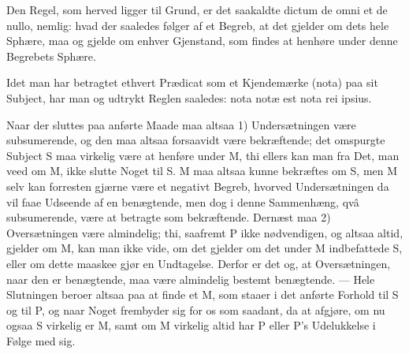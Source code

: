 \documentclass[12pt]{book}
\def\textit#1{#1}%
\newcommand{\opage}[1]{\marginnote{\footnotesize\textit{[#1]}}}
\begin{document}
Den Regel, som herved ligger til Grund, er det saakaldte \textit{dictum de omni
et de nullo}, nemlig: hvad der saaledes følger af et Begreb, at det gjelder om
dets hele Sphære, maa og gjelde om enhver Gjenstand, som findes at henhøre
under denne Begrebets Sphære.

Idet man har betragtet ethvert Prædicat som et Kjendemærke (\textit{nota}) paa
sit Subject, har
\opage{338} man og udtrykt Reglen saaledes: \textit{nota notæ est nota rei ipsius}.

Naar der sluttes paa anførte Maade maa altsaa 1) Undersætningen være
subsumerende, og den maa altsaa forsaavidt være bekræftende; det omspurgte
Subject \textit{S} maa virkelig være at henføre under \textit{M}, thi ellers
kan man fra Det, man veed om \textit{M}, ikke slutte Noget til \textit{S}.
\textit{M} maa altsaa kunne bekræftes om \textit{S}, men \textit{M} selv kan
forresten gjærne være et negativt Begreb, hvorved Undersætningen da vil faae
Udseende af en benægtende, men dog i denne Sammenhæng, \textit{qvâ}
subsumerende, være at betragte som bekræftende. Dernæst maa 2) Oversætningen
være almindelig; thi, saafremt \textit{P} ikke nødvendigen, og altsaa altid,
gjelder om \textit{M}, kan man ikke vide, om det gjelder om det under
\textit{M} indbefattede \textit{S}, eller om dette maaskee gjør en Undtagelse.
Derfor er det og, at Oversætningen, naar den er benægtende, maa være almindelig
bestemt benægtende. --- Hele Slutningen beroer altsaa paa at finde et
\textit{M}, som staaer i det anførte Forhold til \textit{S} og til \textit{P},
og naar Noget frembyder sig for os som saadant, da at afgjøre, om nu ogsaa
\textit{S} virkelig er \textit{M}, samt om \textit{M} virkelig altid har
\textit{P} eller \textit{P}'s Udelukkelse i Følge med sig.
\end{document}
